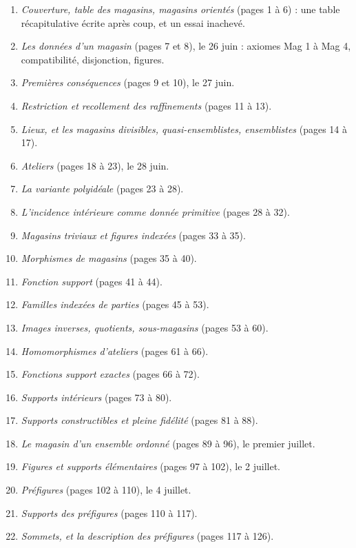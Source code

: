 \documentclass[11pt,a4paper]{article}
\begin{document}
\begin{enumerate}
\item[1.] \emph{Couverture, table des magasins, magasins orientés} (pages 1 à
6) : une table récapitulative écrite après coup, et un essai inachevé.
\item[2.] \emph{Les données d'un magasin} (pages 7 et 8), le 26 juin :
axiomes Mag 1 à Mag 4, compatibilité, disjonction, figures.
\item[3.] \emph{Premières conséquences} (pages 9 et 10), le 27 juin.
\item[4.] \emph{Restriction et recollement des raffinements} (pages 11 à 13).
\item[5.] \emph{Lieux, et les magasins divisibles, quasi-ensemblistes,
ensemblistes} (pages 14 à 17).
\item[6.] \emph{Ateliers} (pages 18 à 23), le 28 juin.
\item[7.] \emph{La variante polyidéale} (pages 23 à 28).
\item[8.] \emph{L'incidence intérieure comme donnée primitive} (pages 28 à 32).
\item[9.] \emph{Magasins triviaux et figures indexées} (pages 33 à 35).
\item[10.] \emph{Morphismes de magasins} (pages 35 à 40).
\item[11.] \emph{Fonction support} (pages 41 à 44).
\item[12.] \emph{Familles indexées de parties} (pages 45 à 53).
\item[13.] \emph{Images inverses, quotients, sous-magasins} (pages 53 à 60).
\item[14.] \emph{Homomorphismes d'ateliers} (pages 61 à 66).
\item[15.] \emph{Fonctions support exactes} (pages 66 à 72).
\item[16.] \emph{Supports intérieurs} (pages 73 à 80).
\item[17.] \emph{Supports constructibles et pleine fidélité} (pages 81 à 88).
\item[18.] \emph{Le magasin d'un ensemble ordonné} (pages 89 à 96), le
premier juillet.
\item[19.] \emph{Figures et supports élémentaires} (pages 97 à 102), le 2
juillet.
\item[20.] \emph{Préfigures} (pages 102 à 110), le 4 juillet.
\item[21.] \emph{Supports des préfigures} (pages 110 à 117).
\item[22.] \emph{Sommets, et la description des préfigures} (pages 117 à 126).
\end{enumerate}
\end{document}
